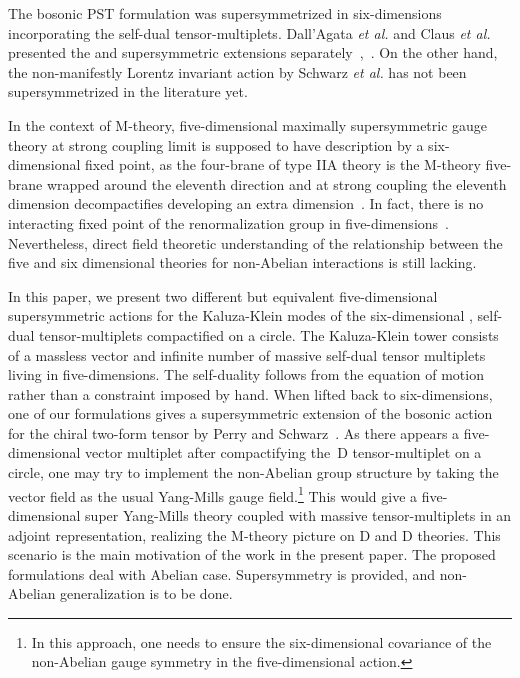 \documentclass[a4paper,12pt]{article}
\begin{document}
\indent The bosonic PST formulation was  supersymmetrized in six-dimensions incorporating the self-dual  tensor-multiplets.  Dall'Agata \textit{et al.} and Claus \textit{et al.} presented  the \coordHE{} and \coordHE{}  supersymmetric extensions separately~\cite{9710127},~\cite{9711161}. On the other hand,  the  non-manifestly Lorentz invariant action by Schwarz \textit{et al.} has not been supersymmetrized in the literature yet.  \newline






\indent In the context of M-theory, five-dimensional maximally   supersymmetric  gauge theory at strong coupling limit is supposed to have description by a six-dimensional \coordHE{} fixed point, as the four-brane of type IIA theory is the M-theory five-brane wrapped around the eleventh direction and at strong coupling the eleventh dimension decompactifies developing an extra dimension~\cite{9702136,9704089}.  In fact, there is no interacting   fixed point of the renormalization group in five-dimensions~\cite{seiberg16}.  Nevertheless, direct  field theoretic understanding of the relationship between the five and six dimensional theories for non-Abelian interactions  is still lacking.   \newline




\indent In this paper, we present two different but equivalent  five-dimensional supersymmetric actions for the Kaluza-Klein modes of  the six-dimensional \coordHE{}, \coordHE{} self-dual tensor-multiplets compactified on a circle.  The Kaluza-Klein tower consists of a massless vector and infinite number of massive self-dual tensor multiplets living in five-dimensions. The self-duality follows from the equation of motion rather than a constraint imposed by hand.  When lifted back to six-dimensions, one of our formulations   gives  a  supersymmetric extension of the bosonic action for the chiral two-form tensor by Perry and Schwarz~\cite{9611065}.  As there appears a five-dimensional vector multiplet after  compactifying  the \coordHE{}\,D  tensor-multiplet on a circle, one may try to implement the non-Abelian group structure by taking the vector field as the usual Yang-Mills gauge field.\footnote{In this approach, one needs to ensure the six-dimensional covariance of the non-Abelian gauge symmetry in the five-dimensional action.}  This would give a five-dimensional super Yang-Mills theory coupled with massive tensor-multiplets in an adjoint representation, realizing the M-theory picture on \coordHE{}D and \coordHE{}D theories.  This scenario is the main motivation of the work in the present paper. The proposed formulations deal with Abelian case. Supersymmetry is provided, and non-Abelian generalization is to be done. \newline
\end{document}
